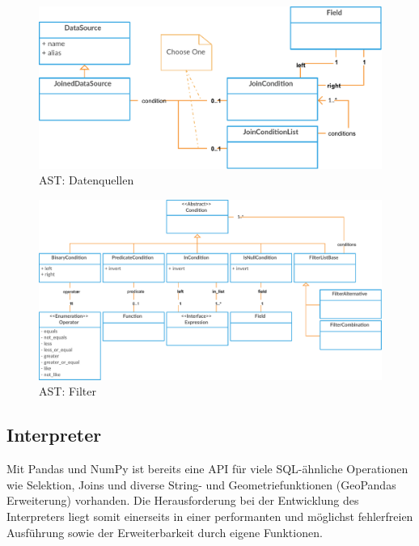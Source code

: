\begin{figure}[H]
\centering
\includegraphics[width=0.8\linewidth]{fig/odhql-ast-datasources.pdf}
\caption{AST: Datenquellen}
\label{fig:pd:odhql-flow}
\end{figure}

\begin{figure}[H]
\centering
\includegraphics[width=0.8\linewidth]{fig/odhql-ast-filter.pdf}
\caption{AST: Filter}
\label{fig:pd:odhql-flow}
\end{figure}

\subsection{Interpreter}
\xxx[fscala]
Mit Pandas und NumPy ist bereits eine API für viele SQL-ähnliche Operationen wie Selektion, Joins und diverse String- und Geometriefunktionen (GeoPandas Erweiterung) vorhanden. Die Herausforderung bei der Entwicklung des Interpreters liegt somit einerseits in einer performanten und möglichst fehlerfreien Ausführung sowie der Erweiterbarkeit durch eigene Funktionen.


